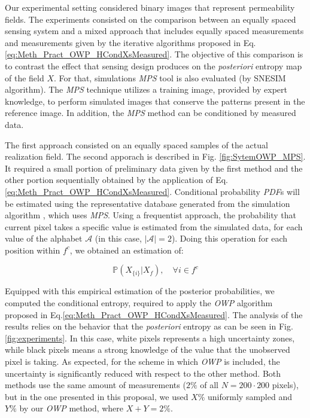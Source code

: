 Our experimental setting considered binary images that represent permeability fields. The experiments consisted on the comparison between an equally spaced sensing system and a mixed approach that includes equally spaced measurements and measurements given by the iterative algorithms proposed in Eq. \eqref{eq:Meth_Pract_OWP_HCondXsMeasured}. The objective of this comparison is to contrast the effect that sensing design produces on the \emph{posteriori} entropy map of the field $X$. For that, simulations \emph{MPS} tool is also evaluated (by SNESIM algorithm)\cite{huang_2013_a}. The \emph{MPS} technique utilizes a training image, provided by expert knowledge, to perform simulated images that conserve the patterns present in the reference image. In addition, the \emph{MPS} method can be conditioned by measured data.

The first approach consisted on an equally spaced samples of the actual realization field. The second apporach is described in Fig. \ref{fig:SytemOWP_MPS}. It required a small portion of preliminary data given by the first method and the other portion sequentially obtained by the application of Eq.\eqref{eq:Meth_Pract_OWP_HCondXsMeasured}. Conditional probability \emph{PDF}s will be estimated using the representative database generated from the simulation algorithm \cite{huang_2013_a,Ortiz_2004_a}, which uses \emph{MPS}. Using a frequentist approach, the probability that current pixel takes a specific value is estimated from the simulated data, for each value of the alphabet $\mathcal{A}$ (in this case, $|\mathcal{A}|=2$). Doing this operation for each position within $f^c$, we obtained an estimation of:

\begin{equation}\label{eq_sec_exp_1}
\mathds{P}(X_{ \{i \} } | X_{f}), \quad \forall i \in f^c
\end{equation}

Equipped with this empirical estimation of the posterior probabilities, we computed the conditional entropy, required to apply the \emph{OWP} algorithm proposed in Eq.\eqref{eq:Meth_Pract_OWP_HCondXsMeasured}. The analysis of the results relies on the behavior that the \emph{posteriori} entropy as can be seen in Fig. \ref{fig:experiments}. In this case, white pixels represents a high uncertainty zones, while black pixels means a strong knowledge of the value that the unobserved pixel is taking. As expected, for the scheme in which \emph{OWP} is included, the uncertainty is significantly reduced with respect to the other method. Both methods use the same amount of measurements ($2\%$ of all $N = 200 \cdot 200$ pixels), but in the one presented in this proposal, we used $X\%$ uniformly sampled and $Y\%$ by our \emph{OWP} method, where $X+Y =2\%$.

